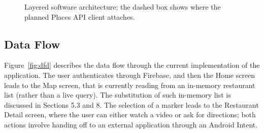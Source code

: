 \documentclass[12pt, a4paper]{article}
\begin{document}
\begin{figure}[H]
\centering
{}
\caption[Layered software architecture.]{Layered software architecture; the dashed box shows where the planned Places API client attaches.}
\label{fig:arch}
\end{figure}

\subsection{Data Flow}

Figure~\ref{fig:dfd} describes the data flow through the current implementation of the application. The user authenticates through Firebase, and then the Home screen leads to the Map screen, that is currently reading from an in-memory restaurant list (rather than a live query). The substitution of such in-memory list is discussed in Sections 5.3 and 8. The selection of a marker leads to the Restaurant Detail screen, where the user can either watch a video or ask for directions; both actions involve handing off to an external application through an Android Intent.
\end{document}

